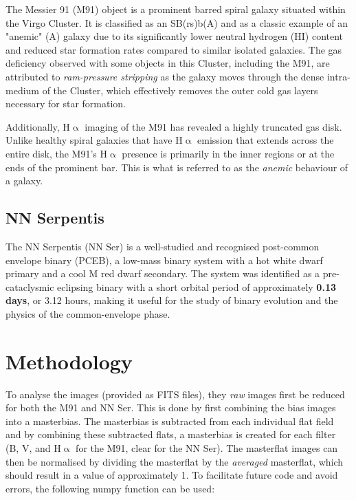 \documentclass[11pt, a4paper, twocolumn]{article}
\begin{document}
The Messier 91 (M91) object is a prominent barred spiral galaxy situated within the Virgo Cluster. It is classified as an SB(rs)b(A) and as a classic example of an "anemic" (A) galaxy due to its significantly lower neutral hydrogen (HI) content and reduced star formation rates compared to similar isolated galaxies. The gas deficiency observed with some objects in this Cluster, including the M91, are attributed to \textit{ram-pressure stripping} as the galaxy moves through the dense intra-medium of the Cluster, which effectively removes the outer cold gas layers necessary for star formation.
\cite{cayatte1990vla,FrommertKronberg2007,graham1999hubble,koopmann2004halpha}

Additionally, H$\upalpha$ imaging of the M91 has revealed a highly truncated gas disk. Unlike healthy spiral galaxies that have H$\upalpha$ emission that extends across the entire disk, the M91's H$\upalpha$ presence is primarily in the inner regions or at the ends of the prominent bar. This is what is referred to as the \textit{anemic} behaviour of a galaxy. \cite{koopmann2004halpha}

\subsection{NN Serpentis}

The NN Serpentis (NN Ser) is a well-studied and recognised post-common envelope binary (PCEB), a low-mass binary system with a hot white dwarf primary and a cool M red dwarf secondary. The system was identified as a pre-cataclysmic eclipsing binary with a short orbital period of approximately \textbf{0.13 days}, or 3.12 hours, making it useful for the study of binary evolution and the physics of the common-envelope phase. \cite{parsons2010precise,beuermann2010two}

\section{Methodology} \label{sec:2}

To analyse the images (provided as FITS files), they \textit{raw} images first be reduced for both the M91 and NN Ser. This is done by first combining the bias images into a masterbias. The masterbias is subtracted from each individual flat field and by combining these subtracted flats, a masterbias is created for each filter (B, V, and H$\upalpha$ for the M91, clear for the NN Ser). The masterflat images can then be normalised by dividing the masterflat by the \textit{averaged} masterflat, which should result in a value of approximately 1. To facilitate future code and avoid errors, the following numpy function can be used:
\end{document}
